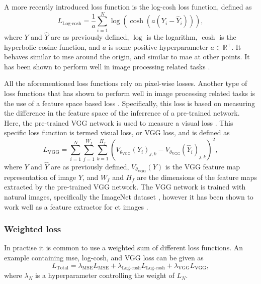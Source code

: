 A more recently introduced loss function is the log-cosh loss function, defined as \cite{chen2019log}
\begin{equation}
    \label{eq:logcosh}
    L_{\text{Log-cosh}} = \frac{1}{a} \sum_{i=1}^N \log ( \cosh ( a ( Y_i - \hat{Y}_i))),
\end{equation}
where $Y$ and $\hat{Y}$ are as previously defined, $\log$ is the logarithm, $\cosh$ is the hyperbolic cosine function, and $a$ is some positive hyperparameter $a \in \mathbb{R}^+$. It behaves similar to \acrshort{mse} around the origin, and similar to \acrshort{mae} at other points. It has been shown to perform well in image processing related tasks \cite{7797130}.

All the aforementioned loss functions rely on pixel-wise losses. Another type of loss functions that has shown to perform well in image processing related tasks is the use of a feature space based loss \cite{vggloss}. Specifically, this loss is based on measuring the difference in the feature space of the inferrence of a pre-trained network. Here, the pre-trained VGG network is used to measure a visual loss \cite{simonyan2015deep}. This specific loss function is termed visual loss, or VGG loss, and is defined as \cite{vggloss,liu2020tomogan}
\begin{equation}
    \label{eq:vgg}
    L_{\text{VGG}} = \sum_{i=1}^{N} \sum_{j=1}^{W_f} \sum_{k=1}^{H_f} \left(V_{\theta_{\text{VGG}}} (Y_i)_{j,k} - V_{\theta_{\text{VGG}}} (\hat{Y}_i)_{j,k} \right)^2,
\end{equation}
where $Y$ and $\hat{Y}$ are as previously defined, $V_{\theta_{\text{VGG}}}(Y)$ is the VGG feature map representation of image $Y$, and $W_f$ and $H_f$ are the dimensions of the feature maps extracted by the pre-trained VGG network. The VGG network is trained with natural images, specifically the ImageNet dataset \cite{deng2009imagenet}, however it has been shown to work well as a feature extractor for \acrshort{ct} images \cite{8340157}. 


\subsubsection{Weighted loss}
In practise it is common to use a weighted sum of different loss functions. 
An example containing \acrshort{mse}, log-cosh, and VGG loss can be given as
\begin{equation}
    \label{eq:weightedloss}
    L_{\text{Total}} = \lambda_{\text{MSE}}L_{\text{MSE}} + \lambda_{\text{Log-cosh}}L_{\text{Log-cosh}} + \lambda_{\text{VGG}}L_{\text{VGG}},
\end{equation}
where $\lambda_N$ is a hyperparameter controlling the weight of $L_N$. 

